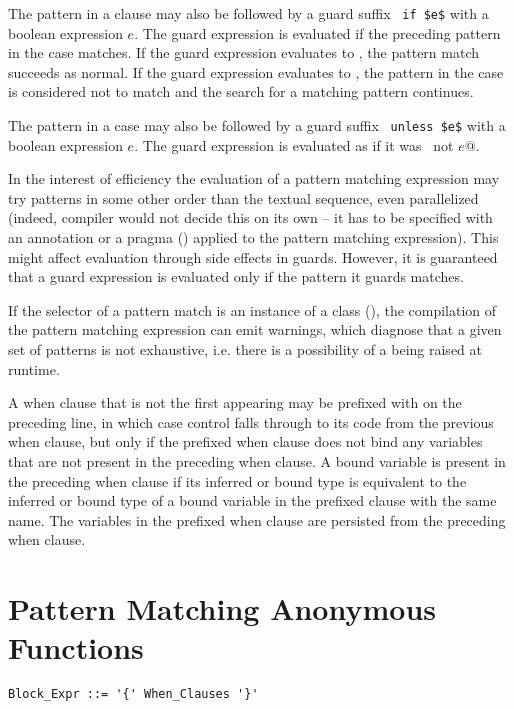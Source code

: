 The pattern in a  clause may also be followed by a guard suffix ~\lstinline!if $e$! with a boolean expression $e$. The guard expression is evaluated if the preceding pattern in the case matches. If the guard expression evaluates to , the pattern match succeeds as normal. If the guard expression evaluates to , the pattern in the case is considered not to match and the search for a matching pattern continues. 

The pattern in a case may also be followed by a guard suffix ~\lstinline!unless $e$! with a boolean expression $e$. The guard expression is evaluated as if it was ~\lstinline@if not $e$@. 

In the interest of efficiency the evaluation of a pattern matching expression may try patterns in some other order than the textual sequence, even parallelized (indeed, compiler would not decide this on its own -- it has to be specified with an annotation or a pragma () applied to the pattern matching expression). This might affect evaluation through side effects in guards. However, it is guaranteed that a guard expression is evaluated only if the pattern it guards matches.

If the selector of a pattern match is an instance of a  class (), the compilation of the pattern matching expression can emit warnings, which diagnose that a given set of patterns is not exhaustive, i.e. there is a possibility of a  being raised at runtime. 

A when clause that is not the first appearing may be prefixed with  on the preceding line, in which case control falls through to its code from the previous when clause, but only if the prefixed when clause does not bind any variables that are not present in the preceding when clause. A bound variable is present in the preceding when clause if its inferred or bound type is equivalent to the inferred or bound type of a bound variable in the prefixed clause with the same name. The variables in the prefixed when clause are persisted from the preceding when clause. 






\section{Pattern Matching Anonymous Functions}
\label{sec:pattern-matching-anon-fun}

\syntax\begin{lstlisting}
Block_Expr ::= '{' When_Clauses '}'
\end{lstlisting}

